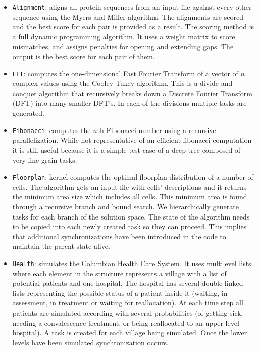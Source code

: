 \documentclass[sigconf]{acmart}
\begin{document}
\begin{itemize}
\item \texttt{Alignment}: aligns all protein sequences from  an  input
file  against  every  other  sequence  using  the Myers and Miller 
algorithm. The alignments are scored and the best score for each pair is
provided as a result. The scoring method is  a  full  dynamic  programming
algorithm. It uses  a  weight matrix to score mismatches, and assigns
penalties for opening and extending gaps. The output is the best score for each
pair of them.
\item \texttt{FFT}: computes the one-dimensional Fast Fourier Transform
of a vector of $n$ complex values using the Cooley-Tukey 
algorithm. This is a divide and conquer algorithm that  recursively  breaks
down a Discrete Fourier Transform (DFT) into many smaller DFT’s. In each of the
divisions multiple tasks are generated.
\item \texttt{Fibonacci}: computes the $n$th Fibonacci number using a  recursive
parallelization. While  not  representative  of  an efficient  fibonacci
computation  it  is  still  useful  because  it  is a simple test case of a
deep tree composed of very fine grain tasks.  
\item \texttt{Floorplan}: kernel computes the optimal floorplan distribution
of a number of cells. The algorithm gets an input file with  cells'
descriptions  and  it  returns  the  minimum  area  size which includes all
cells. This minimum area is found through a recursive branch and bound search.
We hierarchically generate tasks  for  each  branch  of  the  solution  space.
The  state  of  the algorithm needs to be copied into each newly created task
so they can proceed. This implies that additional synchronizations have been
introduced in the code to maintain the parent state alive.
\item \texttt{Health}: simulates the Columbian Health Care System. It
uses multilevel lists where each element in the structure  represents  a
village with  a  list  of  potential patients and one hospital. The hospital
has several double-linked lists representing the possible status of a patient
inside it (waiting, in assessment,   in   treatment   or   waiting   for
reallocation).  At  each time step  all  patients  are  simulated  according
with several probabilities (of getting sick, needing a convalescence treatment,
or  being  reallocated to  an  upper  level  hospital).  A  task  is  created
for  each  village being  simulated. Once the lower levels have been simulated
synchronization occurs. 

\end{itemize}
\end{document}
